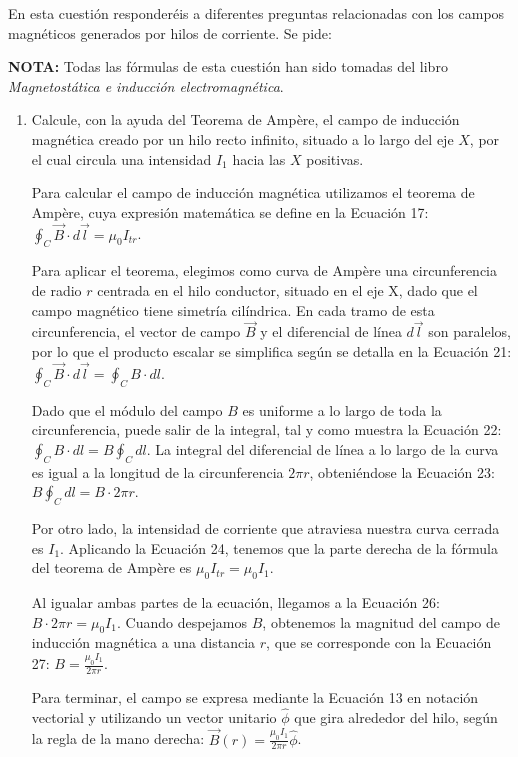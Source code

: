 \documentclass[11pt, a4paper]{article}
\newenvironment{problem}[1][Cuestión]{
	\vspace{0.5cm}
	\noindent{\Large\bfseries #1} \par\vspace{0.5cm}
}{
	\vspace{0.5cm}
}
\begin{document}
	\begin{problem}[Cuestión 2]
		En esta cuestión responderéis a diferentes preguntas relacionadas con los campos magnéticos generados por hilos de corriente. Se pide:

		{ \color{blue} 
			\textbf{NOTA:} Todas las fórmulas de esta cuestión han sido tomadas del libro \textit{Magnetostática e inducción electromagnética}.
		}

		\begin{enumerate}[label=\alph*)] 
			\item Calcule, con la ayuda del Teorema de Ampère, el campo de inducción magnética creado por un hilo recto infinito, situado a lo largo del eje $X$, por el cual circula una intensidad $I_1$ hacia las $X$ positivas.

				{ \color{blue} 
					Para calcular el campo de inducción magnética utilizamos el teorema de Ampère, cuya expresión matemática se define en la Ecuación 17: $\oint_C \vec{B} \cdot d\vec{l} = \mu_0 I_{tr}$.

					Para aplicar el teorema, elegimos como curva de Ampère una circunferencia de radio $r$ centrada en el hilo conductor, situado en el eje X, dado que el campo magnético tiene simetría cilíndrica. En cada tramo de esta circunferencia, el vector de campo $\vec{B}$ y el diferencial de línea $d\vec{l}$ son paralelos, por lo que el producto escalar se simplifica según se detalla en la Ecuación 21: $\oint_C \vec{B} \cdot d\vec{l} = \oint_C B \cdot dl$.

					Dado que el módulo del campo $B$ es uniforme a lo largo de toda la circunferencia, puede salir de la integral, tal y como muestra la Ecuación 22: $\oint_C B \cdot dl = B \oint_C dl$. La integral del diferencial de línea a lo largo de la curva es igual a la longitud de la circunferencia $2\pi r$, obteniéndose la Ecuación 23: $B \oint_C dl = B \cdot 2\pi r$.

					Por otro lado, la intensidad de corriente que atraviesa nuestra curva cerrada es $I_1$. Aplicando la Ecuación 24, tenemos que la parte derecha de la fórmula del teorema de Ampère es $\mu_0 I_{tr} = \mu_0 I_1$.

					Al igualar ambas partes de la ecuación, llegamos a la Ecuación 26: $B \cdot 2\pi r = \mu_0 I_1$. Cuando despejamos $B$, obtenemos la magnitud del campo de inducción magnética a una distancia $r$, que se corresponde con la Ecuación 27: $B = \frac{\mu_0 I_1}{2\pi r}$.

					Para terminar, el campo se expresa mediante la Ecuación 13 en notación vectorial y utilizando un vector unitario $\hat{\phi}$ que gira alrededor del hilo, según la regla de la mano derecha: $\boxed{\vec{B}(r) = \frac{\mu_0 I_1}{2\pi r} \hat{\phi}}$.
				}


\end{enumerate}
\end{problem}
\end{document}
